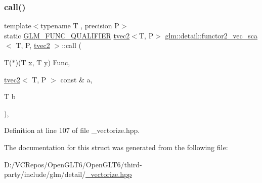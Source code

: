 \subsubsection{\texorpdfstring{call()}{call()}}
{\footnotesize\ttfamily template$<$typename T , precision P$>$ \\
static \mbox{\hyperlink{setup_8hpp_a33fdea6f91c5f834105f7415e2a64407}{G\+L\+M\+\_\+\+F\+U\+N\+C\+\_\+\+Q\+U\+A\+L\+I\+F\+I\+ER}} \mbox{\hyperlink{structglm_1_1tvec2}{tvec2}}$<$T, P$>$ \mbox{\hyperlink{structglm_1_1detail_1_1functor2__vec__sca}{glm\+::detail\+::functor2\+\_\+vec\+\_\+sca}}$<$ T, P, \mbox{\hyperlink{structglm_1_1tvec2}{tvec2}} $>$\+::call (\begin{DoxyParamCaption}\item[{T($\ast$)(T \mbox{\hyperlink{glad_8h_a92d0386e5c19fb81ea88c9f99644ab1d}{x}}, T \mbox{\hyperlink{glad_8h_a66ddd433d2cacfe27f5906b7e86faeed}{y}})}]{Func,  }\item[{\mbox{\hyperlink{structglm_1_1tvec2}{tvec2}}$<$ T, P $>$ const \&}]{a,  }\item[{T}]{b }\end{DoxyParamCaption})\hspace{0.3cm}{\ttfamily [inline]}, {\ttfamily [static]}}



Definition at line 107 of file \+\_\+vectorize.\+hpp.



The documentation for this struct was generated from the following file\+:\begin{DoxyCompactItemize}
\item 
D\+:/\+V\+C\+Repos/\+Open\+G\+L\+T6/\+Open\+G\+L\+T6/third-\/party/include/glm/detail/\mbox{\hyperlink{__vectorize_8hpp}{\+\_\+vectorize.\+hpp}}\end{DoxyCompactItemize}
